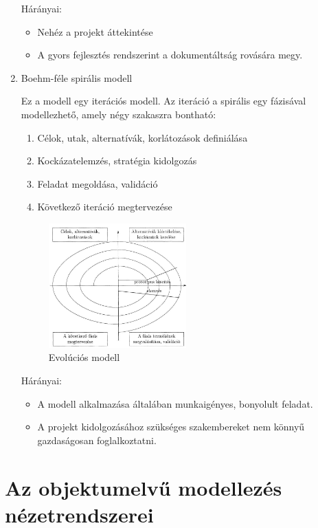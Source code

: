 \documentclass[margin=0px]{article}
\begin{document}
\begin{enumerate}
				Hárányai: 
				\begin{itemize}
					\item Nehéz a projekt áttekintése
					\item A gyors fejlesztés rendszerint a dokumentáltság rovására megy.
				\end{itemize}
			\item Boehm-féle spirális modell
			
				Ez a modell egy iterációs modell. Az iteráció a spirális egy
				fázisával modellezhető, amely négy szakaszra bontható:
				\begin{enumerate}
					\item Célok, utak, alternatívák, korlátozások definiálása
					\item Kockázatelemzés, stratégia kidolgozás
					\item Feladat megoldása, validáció
					\item Következő iteráció megtervezése
				\end{enumerate}
				
				\begin{figure}[H]
					\centering
					\includegraphics[width=0.5\textwidth]{img/spiral.png}
					\caption{Evolúciós modell}
					\label{fig:spiral}
				\end{figure}
				
				Hárányai: 
				\begin{itemize}
					\item A modell alkalmazása általában munkaigényes, bonyolult feladat.
					\item A projekt kidolgozásához szükséges szakembereket nem könnyű
					gazdaságosan foglalkoztatni.
				\end{itemize}
		\end{enumerate}
		
	\section{Az objektumelvű modellezés nézetrendszerei}
	
\end{document}
